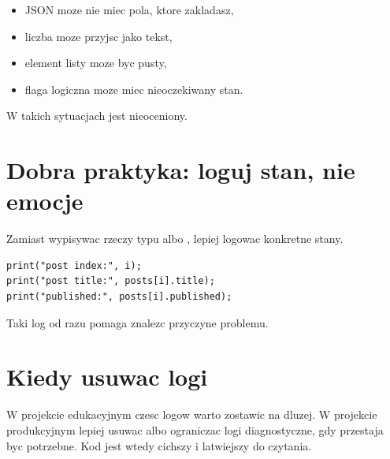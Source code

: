 \begin{itemize}
  \item JSON moze nie miec pola, ktore zakladasz,
  \item liczba moze przyjsc jako tekst,
  \item element listy moze byc pusty,
  \item flaga logiczna moze miec nieoczekiwany stan.
\end{itemize}

W takich sytuacjach  jest nieoceniony.

\section{Dobra praktyka: loguj stan, nie emocje}
Zamiast wypisywac rzeczy typu  albo , lepiej logowac
konkretne stany.

\begin{lstlisting}[style=moonchunk,caption={Przyklad konkretnego logu}]
print("post index:", i);
print("post title:", posts[i].title);
print("published:", posts[i].published);
\end{lstlisting}

Taki log od razu pomaga znalezc przyczyne problemu.

\section{Kiedy usuwac logi}
W projekcie edukacyjnym czesc logow warto zostawic na dluzej. W projekcie produkcyjnym
lepiej usuwac albo ograniczac logi diagnostyczne, gdy przestaja byc potrzebne. Kod jest
wtedy cichszy i latwiejszy do czytania.
